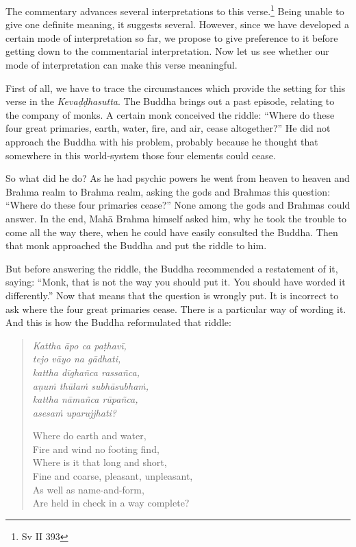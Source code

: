 The commentary advances several interpretations to this verse.\footnote{Sv II 393} Being unable to give one definite meaning, it suggests several. However, since we have developed a certain mode of interpretation so far, we propose to give preference to it before getting down to the commentarial interpretation. Now let us see whether our mode of interpretation can make this verse meaningful.

First of all, we have to trace the circumstances which provide the setting for this verse in the \emph{Kevaḍḍhasutta}. The Buddha brings out a past episode, relating to the company of monks. A certain monk conceived the riddle: ``Where do these four great primaries, earth, water, fire, and air, cease altogether?'' He did not approach the Buddha with his problem, probably because he thought that somewhere in this world-system those four elements could cease.

So what did he do? As he had psychic powers he went from heaven to heaven and Brahma realm to Brahma realm, asking the gods and Brahmas this question: ``Where do these four primaries cease?'' None among the gods and Brahmas could answer. In the end, Mahā Brahma himself asked him, why he took the trouble to come all the way there, when he could have easily consulted the Buddha. Then that monk approached the Buddha and put the riddle to him.

But before answering the riddle, the Buddha recommended a restatement of it, saying: ``Monk, that is not the way you should put it. You should have worded it differently.'' Now that means that the question is wrongly put. It is incorrect to ask where the four great primaries cease. There is a particular way of wording it. And this is how the Buddha reformulated that riddle:

\begin{quote}
\emph{Kattha āpo ca paṭhavī,}\\
\emph{tejo vāyo na gādhati,}\\
\emph{kattha dīghañca rassañca,}\\
\emph{aṇuṁ thūlaṁ subhāsubhaṁ,}\\
\emph{kattha nāmañca rūpañca,}\\
\emph{asesaṁ uparujjhati?}

Where do earth and water,\\
Fire and wind no footing find,\\
Where is it that long and short,\\
Fine and coarse, pleasant, unpleasant,\\
As well as name-and-form,\\
Are held in check in a way complete?
\end{quote}

